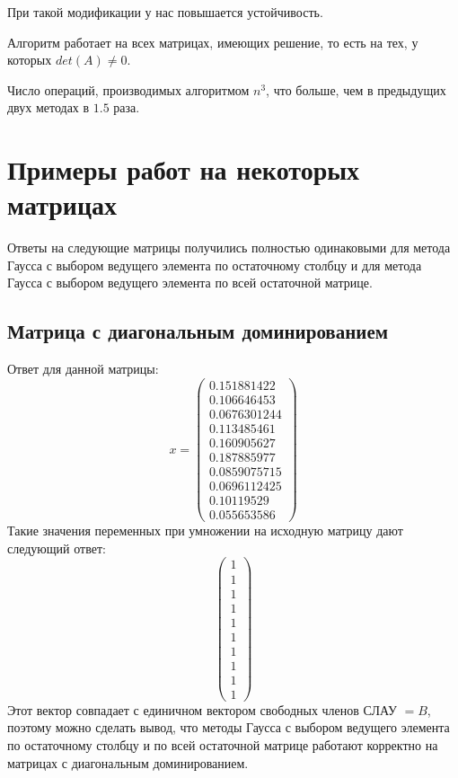 \documentclass[../../report.tex]{subfiles}
\begin{document}
При такой модификации у нас повышается устойчивость.

Алгоритм работает на всех матрицах, имеющих решение, то есть на тех, у которых $det(A) \neq 0$.

Число операций, производимых алгоритмом $n^3$, что больше, чем в предыдущих двух методах в $1.5$ раза.

\section{Примеры работ на некоторых матрицах}
Ответы на следующие матрицы получились полностью одинаковыми для метода Гаусса с выбором ведущего элемента по остаточному столбцу и для метода Гаусса с выбором ведущего элемента по всей остаточной матрице.

\subsection{Матрица с диагональным доминированием}
Ответ для данной матрицы:
\[
x = 
\begin{pmatrix} 
0.151881422 \\
0.106646453 \\
0.0676301244 \\
0.113485461 \\
0.160905627 \\
0.187885977 \\
0.0859075715 \\
0.0696112425 \\
0.10119529 \\
0.055653586 
\end{pmatrix}
\]
Такие значения переменных при умножении на исходную матрицу дают следующий ответ:
\[
\begin{pmatrix}
1 \\
1 \\
1 \\
1 \\
1 \\
1 \\
1 \\
1 \\
1 \\
1
\end{pmatrix}
\]
Этот вектор совпадает с единичном вектором свободных членов СЛАУ $= B$, поэтому можно сделать вывод, что методы Гаусса с выбором ведущего элемента по остаточному столбцу и по всей остаточной матрице работают корректно на матрицах с диагональным доминированием.
\end{document}
